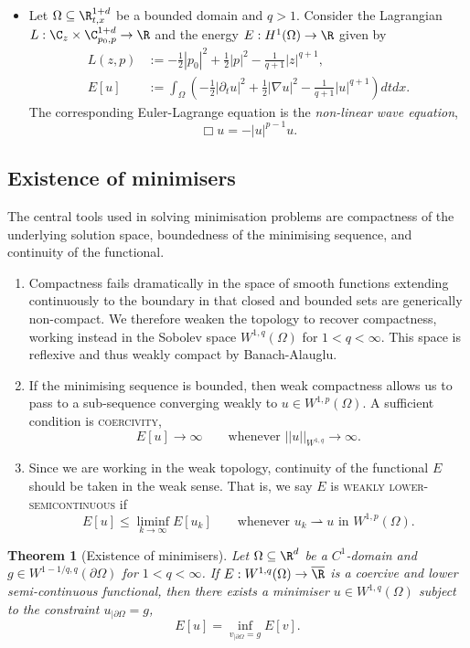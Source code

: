\documentclass[reqno]{amsart}
\newtheorem{theorem}{Theorem}
\theoremstyle{definition}
\theoremstyle{remark}
\renewcommand{\emph}{\textsc}
\begin{document}
\begin{itemize}
	\item Let $\Omega \subseteq \R^{1 + d}_{t, x}$ be a bounded domain and $q > 1$. Consider the Lagrangian $L : \C_z \times \C^{1 + d}_{p_0, p} \to \R$ and the energy $E: H^1 (\Omega) \to \R$ given by
			\begin{align*}
				 L(z, p) 
				 	&:= -\frac12 |p_0|^2 + \frac12 |p|^2 - \frac{1}{q + 1} |z|^{q + 1}, \\
				 E[u] 
				 	&:= \int_\Omega \left( -\frac12 |\partial_t u|^2 + \frac12 |\nabla u|^2 - \frac{1}{q + 1} |u|^{q + 1} \right) dt dx. 
			\end{align*}	 
		The corresponding Euler-Lagrange equation is the \textit{non-linear wave equation},
			\[ \Box u = - |u|^{p - 1} u. \]
			
\end{itemize}

\subsection{Existence of minimisers}

The central tools used in solving minimisation problems are compactness of the underlying solution space, boundedness of the minimising sequence, and continuity of the functional. 
\begin{enumerate}
	\item Compactness fails dramatically in the space of smooth functions extending continuously to the boundary in that closed and bounded sets are generically non-compact. We therefore weaken the topology to recover compactness, working instead in the Sobolev space $W^{1, q} (\Omega)$ for $1 < q < \infty$. This space is reflexive and thus weakly compact by Banach-Alauglu. 
	\item If the minimising sequence is bounded, then weak compactness allows us to pass to a sub-sequence converging weakly to $u \in W^{1, p} (\Omega)$. A sufficient condition is \emph{coercivity}, 
			\[ E[u] \to \infty \qquad \text{whenever } ||u||_{W^{1, q}} \to \infty. \]
	
	\item Since we are working in the weak topology, continuity of the functional $E$ should be taken in the weak sense. That is, we say $E$ is \emph{weakly lower-semicontinuous} if
	\[ E[u] \leq \liminf_{k \to \infty} E[u_k] \qquad \text{whenever $u_k \rightharpoonup u$ in $W^{1, p} (\Omega)$}. \]	
\end{enumerate}


\begin{theorem}[Existence of minimisers]
	Let $\Omega \subseteq \R^d$ be a $C^1$-domain and $g \in W^{1 - 1/q, q} (\partial \Omega)$ for $1 < q < \infty$. If $E : W^{1, q} (\Omega) \to \overline \R$ is a coercive and lower semi-continuous functional, then there exists a minimiser $u \in W^{1, q} (\Omega)$ subject to the constraint $u_{|\partial \Omega} = g$,  
		\[ E[u] = \inf_{v_{|\partial \Omega} = g} E[v]. \]
\end{theorem}
\end{document}
